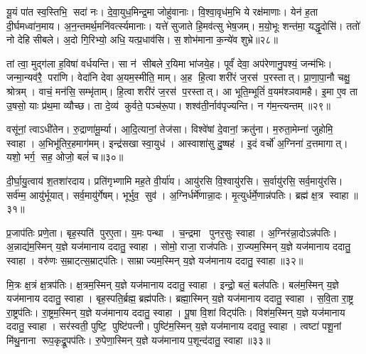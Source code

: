 यू॒यं पा॑त स्व॒स्तिभि॒ सदा॑ नः। दे॒वा॒युध॒मिन्द्र॒मा जोहु॑वानाः। वि॒श्वा॒वृध॑म॒भि ये रक्ष॑माणाः। येन॑ ह॒ता दी॒र्घमध्वा॑न॒माय\sn{}। अ॒न॒न्तमर्थ॒मनि॑वर्त्स्यमानाः। यत्ते॑ सुजाते हि॒मव॑त्सु भेष॒जम्। म॒यो॒भूः शन्त॑मा॒ यद्धृ॒दोसि॑। ततो॑ नो देहि सीबले। अ॒दो गि॒रिभ्यो॒ अधि॒ यत्प्र॒धाव॑सि। स॒शोभ॑माना क॒न्ये॑व शुभ्रे॥२८॥

तां त्वा॒ मुद्ग॑ला ह॒विषा॑ वर्धयन्ति। सा न॑ सीबले र॒यिमा भा॑जये॒ह। पूर्वं॑ देवा॒ अप॑रेणानु॒पश्यं॒ जन्म॑भिः। जन्मा॒न्यव॑रै॒ परा॑णि। वेदा॑नि देवा अ॒यम॒स्मीति॒ माम्। अ॒ह हि॒त्वा शरी॑रं ज॒रस॑ प॒रस्तात्। प्रा॒णा॒पा॒नौ चक्षु॒ श्रोत्रम्। वाचं॒ मन॑सि॒ सम्भृ॑ताम्। हि॒त्वा शरी॑रं ज॒रस॑ प॒रस्तात्। आ भूति॒म्भूतिं॑ व॒यम॑श्ञवामहै। इ॒मा ए॒व ता उ॒षसो॒ याः प्र॑थ॒मा व्यौच्छ\sn{}। ता दे॒व्य॑ कुर्वते॒ पञ्च॑रू॒पा। शश्व॑ती॒र्नाव॑पृज्यन्ति। न ग॑म॒न्त्यन्तम्॥२९॥\anuvakamend[क॒रो॒म्यव॑र्त्यै चिच्छुभ्रेऽश्ञवामहै च॒त्वारि॑ च]

वसू॑नां॒ त्वाऽधी॑तेन। रु॒द्राणा॑मू॒र्म्या। आ॒दि॒त्यानां॒ तेज॑सा। विश्वे॑षां दे॒वानां॒ क्रतु॑ना। म॒रुता॒मेम्ना॑ जुहोमि॒ स्वाहा। अ॒भिभू॑तिर॒हमाग॑मम्। इन्द्र॑सखा स्वा॒युध॑। आस्वाशा॑सु दु॒ष्षह॑। इ॒दं वर्चो॑ अ॒ग्निना॑ द॒त्तमागात्। यशो॒ भर्ग॒ सह॒ ओजो॒ बलं॑ च॥३०॥

दी॒र्घा॒यु॒त्वाय॑ श॒तशा॑रदाय। प्रति॑गृभ्णामि मह॒ते वी॒र्या॑य। आयु॑रसि वि॒श्वायु॑रसि। स॒र्वायु॑रसि॒ सर्व॒मायु॑रसि। सर्व॑म्म॒ आयु॑र्भूयात्। सर्व॒मायु॑र्गेषम्। भूर्भुव॒ सुव॑। अ॒ग्निर्धर्मे॑णान्ना॒दः। मृ॒त्युर्धर्मे॒णान्न॑पतिः। ब्रह्म॑ क्ष॒त्र स्वाहा॥३१॥

प्र॒जाप॑तिः प्रणे॒ता। बृह॒स्पति॑ पुरए॒ता। य॒मः पन्था। च॒न्द्रमा पुनर॒सुः स्वाहा। अ॒ग्निर॑न्ना॒दोऽन्न॑पतिः। अ॒न्नाद्य॑म॒स्मिन् य॒ज्ञे यज॑मानाय ददातु॒ स्वाहा। सोमो॒ राजा॒ राज॑पतिः। रा॒ज्यम॒स्मिन् य॒ज्ञे यज॑मानाय ददातु॒ स्वाहा। वरु॑णः स॒म्राट्त्स॒म्राट्प॑तिः। साम्राज्यम॒स्मिन् य॒ज्ञे यज॑मानाय ददातु॒ स्वाहा॥३२॥

मि॒त्रः क्ष॒त्रं क्ष॒त्रप॑तिः। क्ष॒त्रम॒स्मिन् य॒ज्ञे यज॑मानाय ददातु॒ स्वाहा। इन्द्रो॒ बलं॒ बल॑पतिः। बल॑म॒स्मिन् य॒ज्ञे यज॑मानाय ददातु॒ स्वाहा। बृह॒स्पति॒र्ब्रह्म॒ ब्रह्म॑पतिः। ब्रह्मा॒स्मिन् य॒ज्ञे यज॑मानाय ददातु॒ स्वाहा। स॒वि॒ता रा॒ष्ट्र रा॒ष्ट्रप॑तिः। रा॒ष्ट्रम॒स्मिन् य॒ज्ञे यज॑मानाय ददातु॒ स्वाहा। पू॒षा वि॒शां विट्प॑तिः। विश॑म॒स्मिन् य॒ज्ञे यज॑मानाय ददातु॒ स्वाहा। सर॑स्वती॒ पुष्टि॒ पुष्टि॑पत्नी। पुष्टि॑म॒स्मिन् य॒ज्ञे यज॑मानाय ददातु॒ स्वाहा। त्वष्टा॑ पशू॒नां मि॑थु॒नाना रूप॒कृद्रू॒पप॑तिः। रु॒पेणा॒स्मिन् य॒ज्ञे यज॑मानाय प॒शून्द॑दातु॒ स्वाहा॥३३॥\anuvakamend[च॒ स्वाहा॒ साम्राज्यम॒स्मिन् य॒ज्ञे यज॑मानाय ददातु॒ स्वाहा॒ विश॑म॒स्मिन् य॒ज्ञे यज॑मानाय ददातु॒ स्वाहा॑ च॒त्वारि॑ च (अ॒ग्निः सोमो॒ वरु॑णो मि॒त्र इन्द्रो॒ बृह॒स्पति॑ सवि॒ता पू॒षा सर॑स्वती॒ त्वष्टा॒ दश॑ ॥ )]

